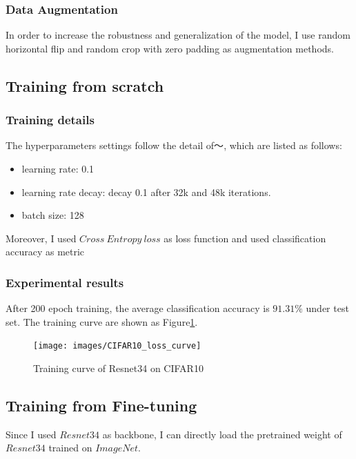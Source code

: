 \documentclass[10pt,twocolumn,letterpaper]{article}
\begin{document}
    \subsubsection{Data Augmentation}
    \par In order to increase the robustness and generalization of the model, I use random horizontal flip and random crop with zero padding as augmentation methods.

    \subsection{Training from scratch}

    \subsubsection{Training details}
    The hyperparameters settings follow the detail of～\cite{he2016deep}, which are listed as follows:
    \begin{itemize}
        \item learning rate: 0.1
        \item learning rate decay: decay 0.1 after 32k and 48k iterations.
        \item batch size: 128
    \end{itemize}
    Moreover, I used $Cross\ Entropy\ loss$ as loss function and used classification accuracy as metric

    \subsubsection{Experimental results}
    After 200 epoch training, the average classification accuracy is $\mathbf{91.31\%}$ under test set.
    The training curve are shown as Figure\ref{fig:train_curve}.
    \begin{center}
        \begin{figure}
            \texttt{[image: images/CIFAR10\_loss\_curve]}
            \caption{Training curve of Resnet34 on CIFAR10}
            \label{fig:train_curve}
        \end{figure}
    \end{center}

    \subsection{Training from Fine-tuning}
    Since I used $Resnet34$ as backbone, I can directly load the pretrained weight of $Resnet34$ trained on $ImageNet$.
\end{document}
